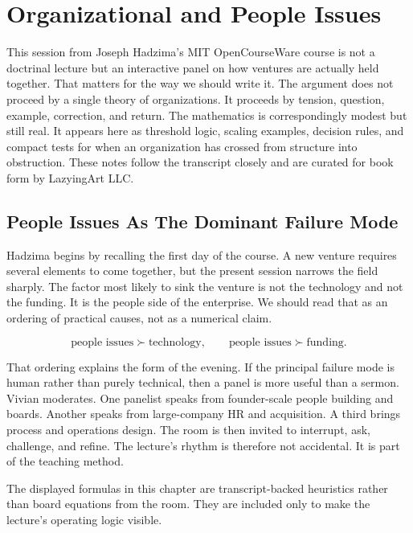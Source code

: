 \chapter{Organizational and People Issues}

This session from Joseph Hadzima's MIT OpenCourseWare course is not a doctrinal lecture but an interactive panel on how ventures are actually held together. That matters for the way we should write it. The argument does not proceed by a single theory of organizations. It proceeds by tension, question, example, correction, and return. The mathematics is correspondingly modest but still real. It appears here as threshold logic, scaling examples, decision rules, and compact tests for when an organization has crossed from structure into obstruction. These notes follow the transcript closely and are curated for book form by LazyingArt LLC.

\section{People Issues As The Dominant Failure Mode}

Hadzima begins by recalling the first day of the course. A new venture requires several elements to come together, but the present session narrows the field sharply. The factor most likely to sink the venture is not the technology and not the funding. It is the people side of the enterprise. We should read that as an ordering of practical causes, not as a numerical claim.

\begin{equation}
\text{people issues} \succ \text{technology},
\qquad
\text{people issues} \succ \text{funding}.
\end{equation}

That ordering explains the form of the evening. If the principal failure mode is human rather than purely technical, then a panel is more useful than a sermon. Vivian moderates. One panelist speaks from founder-scale people building and boards. Another speaks from large-company HR and acquisition. A third brings process and operations design. The room is then invited to interrupt, ask, challenge, and refine. The lecture's rhythm is therefore not accidental. It is part of the teaching method.

\begin{remark}
The displayed formulas in this chapter are transcript-backed heuristics rather than board equations from the room. They are included only to make the lecture's operating logic visible.
\end{remark}

